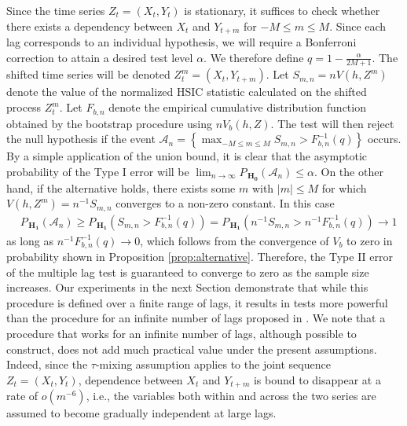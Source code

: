 Since the time series $Z_t=(X_t,Y_t)$ is stationary, it suffices to check whether there exists a dependency between $X_t$ and $Y_{t+m}$ for $-M \leq m \leq M$. Since each lag corresponds to an individual hypothesis, we will require a Bonferroni correction to attain a desired test level $\alpha$. We therefore define $q = 1-\frac{\alpha}{2M+1}$. The shifted time series will be denoted $Z_t^m =(X_t,Y_{t+m})$. Let $S_{m,n}=n V(h,Z^m)$ denote the value of the normalized HSIC statistic calculated on the shifted process $Z_t^m$. Let $F_{b,n}$ denote the empirical cumulative distribution function obtained by the bootstrap procedure using $n V_{b}(h,Z)$. The test will then reject the null hypothesis if the event $\mathcal A_n = \left\{ \max_{-M \leq m \leq M} S_{m,n} > F^{-1}_{b,n}(q) \right\}$ occurs. By a simple application of the union bound, it is clear that the asymptotic probability of the Type I error will be $\lim_{n\to\infty}P_{\,\mathbf{H_0}}\left(\mathcal A_n\right)\leq\alpha$. On the other hand, if the alternative holds, there exists some $m$ with $|m|\leq M$ for which $V(h,Z^m)=n^{-1} S_{m,n}$ converges to a non-zero constant. In this case  
\begin{align}
\label{eg:aletrnative1}
&P_{\,\mathbf{H_1}}(\mathcal A_n)  \geq  P_{\,\mathbf{H_1}}( S_{m,n} > F^{-1}_{b,n}(q)) = P_{\,\mathbf{H_1}}( n^{-1} S_{m,n} > n^{-1} F^{-1}_{b,n}(q) ) \to 1
\end{align}
as long as $n^{-1} F^{-1}_{b,n}(q)\to 0$, which follows from the convergence of $V_{b}$ to zero in probability shown in Proposition \ref{prop:alternative}. Therefore, the Type II error of the multiple lag test is guaranteed to converge to zero as the sample size increases.
Our experiments in the next Section demonstrate that while this procedure is defined over a finite range of lags, it results in tests  more powerful than the procedure for an infinite number of lags proposed in \cite{besserve_statistical_2013}. 
We note that a procedure that works for an infinite number of lags, although possible to construct, does not add much practical value under the present assumptions. Indeed,  since the $\tau$-mixing assumption applies to the joint sequence $Z_t=(X_t,Y_t)$, dependence between $X_t$ and $Y_{t+m}$ is bound to disappear at a rate of $o(m^{-6})$, i.e., the variables both within and across the two series are assumed to become gradually independent at large lags.     
